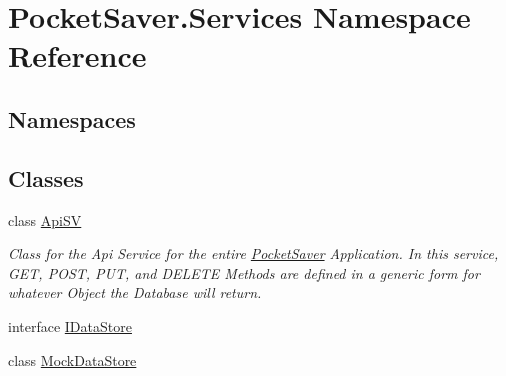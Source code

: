 \hypertarget{namespace_pocket_saver_1_1_services}{}\section{Pocket\+Saver.\+Services Namespace Reference}
\label{namespace_pocket_saver_1_1_services}
\subsection*{Namespaces}
\begin{DoxyCompactItemize}
\end{DoxyCompactItemize}
\subsection*{Classes}
\begin{DoxyCompactItemize}
\item 
class \hyperlink{class_pocket_saver_1_1_services_1_1_api_s_v}{Api\+SV}
\begin{DoxyCompactList}\small\item\em Class for the Api Service for the entire \hyperlink{namespace_pocket_saver}{Pocket\+Saver} Application. In this service, G\+ET, P\+O\+ST, P\+UT, and D\+E\+L\+E\+TE Methods are defined in a generic form for whatever Object the Database will return. \end{DoxyCompactList}\item 
interface \hyperlink{interface_pocket_saver_1_1_services_1_1_i_data_store}{I\+Data\+Store}
\item 
class \hyperlink{class_pocket_saver_1_1_services_1_1_mock_data_store}{Mock\+Data\+Store}
\end{DoxyCompactItemize}
